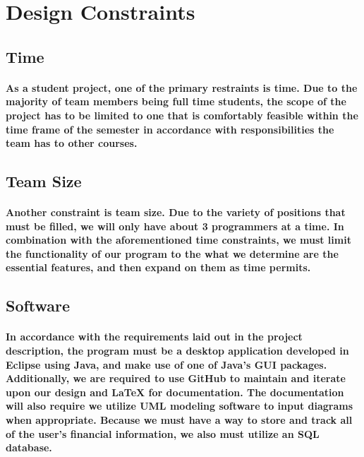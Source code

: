 \documentclass{article}
\begin{document}
\newpage
\section {Design Constraints}

\subsection{Time}
\paragraph{ \indent As a student project, one of the primary restraints is time. Due to the majority of team members being full time students, the scope of the project has to be limited to one that is comfortably feasible within the time frame of the semester in accordance with responsibilities the team has to other courses.}

\subsection{Team Size}
\paragraph{\indent Another constraint is team size. Due to the variety of positions that must be filled, we will only have about 3 programmers at a time. In combination with the aforementioned time constraints, we must limit the functionality of our program to the what we determine are the essential features, and then expand on them as time permits.}

\subsection{Software}
\paragraph{\indent In accordance with the requirements laid out in the project description, the program must be a desktop application developed in Eclipse using Java, and make use of one of Java's GUI packages. Additionally, we are required to use GitHub to maintain and iterate upon our design and LaTeX for documentation. The documentation will also require we utilize UML modeling software to input diagrams when appropriate. Because we must have a way to store and track all of the user's financial information, we also must utilize an SQL database.}
\end{document}

